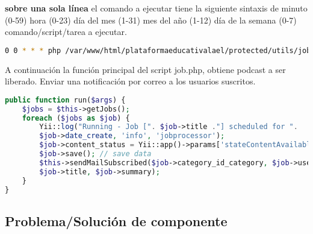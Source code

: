 \begin{itemize}
\textbf{sobre una sola línea} el comando a ejecutar tiene la siguiente sintaxis
de minuto (0-59) hora (0-23) día del mes (1-31) mes del año (1-12) día de la
semana (0-7) comando/script/tarea a ejecutar.

\begin{lstlisting}[language=bash, caption={Comando para ejecución de tarea.}]
0 0 * * * php /var/www/html/plataformaeducativalael/protected/utils/job.php job
\end{lstlisting}

A continuación la función principal del script job.php, obtiene podcast
a ser liberado. Enviar una notificación por correo a los usuarios suscritos.

\begin{lstlisting}[language=PHP, caption={Método principal de clase JobCommand.}]
public function run($args) {
    $jobs = $this->getJobs();
    foreach ($jobs as $job) {
        Yii::log("Running - Job [". $job->title ."] scheduled for ".
        $job->date_create, 'info', 'jobprocessor');
        $job->content_status = Yii::app()->params['stateContentAvailable'];
        $job->save(); // save data
        $this->sendMailSubscribed($job->category_id_category, $job->user_id_user,
        $job->title, $job->summary);
    }
}
\end{lstlisting}

\end{itemize}

\subsection{Problema/Solución de componente}

